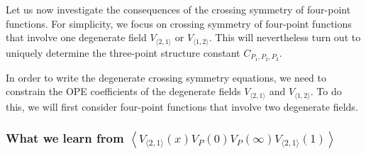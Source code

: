 \documentclass[12pt, a4paper, notitlepage, twoside]{report}
\numberwithin{equation}{section}
\theoremstyle{break}
\begin{document}
Let us now investigate the consequences of the crossing symmetry of four-point functions. For simplicity, we focus on crossing symmetry of four-point functions that involve one degenerate field $V_{\langle 2,1\rangle}$ or $V_{\langle 1, 2\rangle}$. This will nevertheless turn out to uniquely determine the three-point structure constant $C_{P_1,P_2,P_3}$. 

In order to write the degenerate crossing symmetry equations, we need to constrain the OPE coefficients of the degenerate fields $V_{\langle 2,1\rangle}$ and $V_{\langle 1, 2\rangle}$. 
To do this, we will first consider four-point functions that involve two degenerate fields. 

\subsubsection{What we learn from $
 \left\langle V_{\langle 2,1 \rangle}(x) V_P(0) V_{P}(\infty) V_{\langle 2,1 \rangle}(1) \right\rangle$}
 
\end{document}
